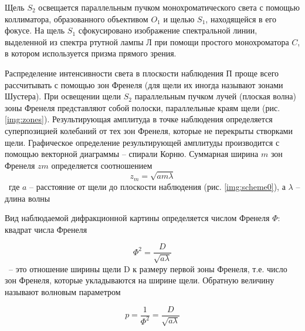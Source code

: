 \documentclass[a5paper,10pt, twoside]{article} %
\begin{document}
	Щель $S_2$ освещается параллельным пучком монохроматического света с помощью коллиматора, 
	образованного объективом $O_1$ и щелью $S_1$, находящейся в его фокусе. На щель $S_1$ сфокусировано
	изображение спектральной линии, выделенной из спектра ртутной лампы $\text{Л}$ при помощи
	простого монохроматора $C$, в котором используется призма прямого зрения.

	Распределение интенсивности света в плоскости наблюдения $\text{П}$ проще всего рассчитывать с
	помощью зон	Френеля (для щели их иногда называют зонами Шустера). При освещении щели $S_2$
	параллельным пучком	лучей (плоская волна) зоны Френеля представляют собой полоски, параллельные
	краям щели (рис. \ref{img:zones}). Результирующая амплитуда в точке наблюдения определяется суперпозицией 
	колебаний от тех зон Френеля, которые не перекрыты створками щели. Графическое определение
	результирующей амплитуды производится с помощью векторной диаграммы -- спирали Корню. 
	Суммарная ширина $m$ зон Френеля $z m$ определяется соотношением
	\begin{equation}
		z_m = \sqrt{a m \lambda}
	\end{equation} \label{eq:wide}
	\
	где $a$ -- расстояние от щели до плоскости наблюдения (рис. \ref{img:scheme0}), а $\lambda$ --
	длина волны

	Вид наблюдаемой дифракционной картины определяется числом Френеля $\Phi$: квадрат числа Френеля

	\begin{displaymath}
		\Phi^2 = \frac{D}{\sqrt{a \lambda}}
	\end{displaymath}
	\
	-- это отношение ширины щели D к размеру первой зоны Френеля, т.е. число зон Френеля, которые
	укладываются на ширине щели. Обратную величину называют волновым параметром

	\begin{displaymath}
		p = \frac{1}{\Phi^2} = \frac{D}{\sqrt{a \lambda}}
	\end{displaymath}
\end{document}
